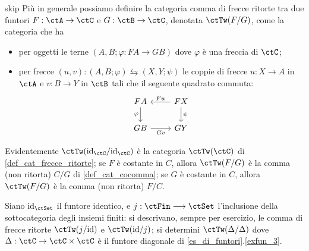 \begin{hDefinition}{skip}
	Più in generale possiamo definire la categoria comma di frecce ritorte tra due funtori \(F : \ctA \to \ctC\) e \(G : \ctB \to \ctC\), denotata \(\ctTw(F/G)\), come la categoria che ha 
	\begin{itemize}
		\item per oggetti le terne $(A,B;\varphi : FA \to GB)$ dove $\varphi$ è una freccia di $\ctC$;
		\item per frecce $(u,v) : (A,B;\varphi) \leftrightarrows (X,Y;\psi)$ le coppie di frecce	$u : X \to A$ in $\ctA$ e $v : B \to	Y$ in $\ctB$ tali che il seguente quadrato commuta:
		      \[
			      \begin{tikzcd}
				      FA \ar{d}[swap]{\varphi} & FX \ar{l}[swap]{Fu} \ar{d}{\psi} \\
				      GB  \ar{r}[swap]{Gv} & GY
			      \end{tikzcd}
		      \]
	\end{itemize}
	Evidentemente $\ctTw(\id_\ctC/\id_\ctC)$ è la categoria $\ctTw(\ctC)$ di \ref{def_cat_frecce_ritorte}; se $F$ è costante in $C$, allora $\ctTw(F/G)$ è la comma (non ritorta) $C/G$ di \ref{def_cat_cocomma}; se $G$ è costante in $C$, allora $\ctTw(F/G)$ è la comma (non ritorta) $F/C$.

	Siano $\id_\ctSet$ il funtore identico, e $j : \ctFin\fun\ctSet$ l'inclusione della sottocategoria degli insiemi finiti: si descrivano, sempre per esercizio, le comma di frecce ritorte $\ctTw(j/\id)$ e $\ctTw(\id/j)$; si determini \(\ctTw(\Delta/\Delta)\) dove \(\Delta : \ctC \to \ctC\times\ctC\) è il funtore diagonale di \ref{es_di_funtori}.\ref{exfun_3}.
\end{hDefinition}
